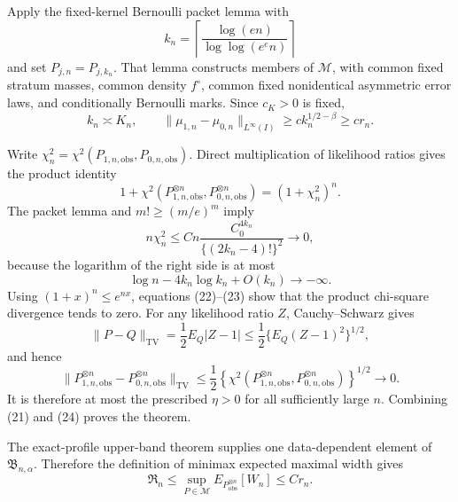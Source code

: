 Apply the fixed-kernel Bernoulli packet lemma with
\[
k_n=\left\lceil\frac{\log(en)}{\log\log(e^e n)}\right\rceil
\]
and set \(P_{j,n}=P_{j,k_n}\).  That lemma constructs members of \(\mathcal M\), with common fixed stratum masses, common density \(f^\circ\), common fixed nonidentical asymmetric error laws, and conditionally Bernoulli marks.  Since \(c_K>0\) is fixed,
\[
k_n\asymp K_n,
\qquad
\|\mu_{1,n}-\mu_{0,n}\|_{L^\infty(I)}
\ge c k_n^{1/2-\beta}\ge c r_n. \tag{21}
\]

Write \(\chi_n^2=\chi^2(P_{1,n,\mathrm{obs}},P_{0,n,\mathrm{obs}})\).  Direct multiplication of likelihood ratios gives the product identity
\[
1+\chi^2(P_{1,n,\mathrm{obs}}^{\otimes n},P_{0,n,\mathrm{obs}}^{\otimes n})
=(1+\chi_n^2)^n. \tag{22}
\]
The packet lemma and \(m!\ge(m/e)^m\) imply
\[
n\chi_n^2
\le Cn\frac{C_0^{4k_n}}{\{(2k_n-4)!\}^2}\longrightarrow0, \tag{23}
\]
because the logarithm of the right side is at most
\[
\log n-4k_n\log k_n+O(k_n)\longrightarrow-\infty.
\]
Using \((1+x)^n\le e^{nx}\), equations (22)--(23) show that the product chi-square divergence tends to zero.  For any likelihood ratio \(Z\), Cauchy--Schwarz gives
\[
\|P-Q\|_{\mathrm{TV}}
=\frac12E_Q|Z-1|
\le\frac12\{E_Q(Z-1)^2\}^{1/2},
\]
and hence
\[
\|P_{1,n,\mathrm{obs}}^{\otimes n}-P_{0,n,\mathrm{obs}}^{\otimes n}\|_{\mathrm{TV}}
\le\frac12\left\{\chi^2(P_{1,n,\mathrm{obs}}^{\otimes n},P_{0,n,\mathrm{obs}}^{\otimes n})\right\}^{1/2}
\longrightarrow0. \tag{24}
\]
It is therefore at most the prescribed \(\eta>0\) for all sufficiently large \(n\).  Combining (21) and (24) proves the theorem.

The exact-profile upper-band theorem supplies one data-dependent element of \(\mathfrak B_{n,\alpha}\).  Therefore the definition of minimax expected maximal width gives
\[
\mathfrak R_n
\le\sup_{P\in\mathcal M}E_{P_{\mathrm{obs}}^{\otimes n}}[W_n]
\le Cr_n. \tag{25}
\]

